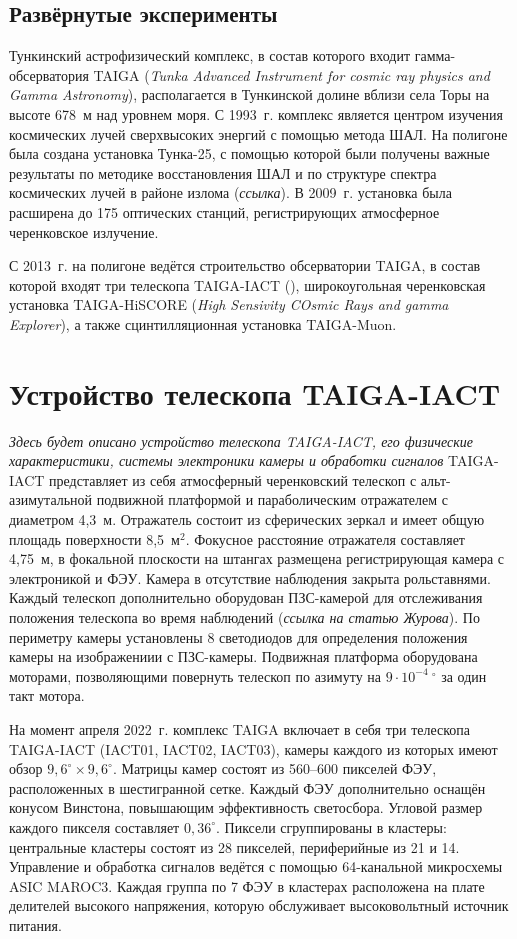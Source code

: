 \documentclass[magd,floatypics,numeref]{msudipl} %
\begin{document}
\subsection{Развёрнутые эксперименты}
Тункинский астрофизический комплекс, в состав которого входит гамма-обсерватория TAIGA (\textit{Tunka Advanced Instrument for cosmic ray physics and Gamma Astronomy}), располагается в Тункинской долине вблизи села Торы на высоте 678~м над уровнем моря. С 1993~г. комплекс является центром изучения космических лучей сверхвысоких энергий с помощью метода ШАЛ. На полигоне была создана установка Тунка-25, с помощью которой были получены важные результаты по методике восстановления ШАЛ и по структуре спектра космических лучей в районе излома (\textit{ссылка}). В 2009~г. установка была расширена до 175 оптических станций, регистрирующих атмосферное черенковское излучение. 

С 2013~г. на полигоне ведётся строительство обсерватории TAIGA, в состав которой входят три телескопа TAIGA-IACT (), широкоугольная черенковская установка TAIGA-HiSCORE (\textit{High Sensivity COsmic Rays and gamma Explorer}), а также сцинтилляционная установка TAIGA-Muon.
\section{Устройство телескопа TAIGA-IACT}
\textit{
Здесь будет описано устройство телескопа TAIGA-IACT, его физические характеристики, системы электроники камеры и обработки сигналов
}
TAIGA-IACT представляет из себя атмосферный черенковский телескоп с альт-азимутальной подвижной платформой и параболическим отражателем с диаметром 4,3~м. Отражатель состоит из сферических зеркал и имеет общую площадь поверхности 8,5~$\text{м}^\text{2}$. Фокусное расстояние отражателя составляет 4,75~м, в фокальной плоскости на штангах размещена регистрирующая камера с электроникой и ФЭУ. Камера в отсутствие наблюдения закрыта рольставнями. Каждый телескоп дополнительно оборудован ПЗС-камерой для отслеживания положения телескопа во время наблюдений (\textit{ссылка на статью Журова}). По периметру камеры установлены 8 светодиодов для определения положения камеры на изображениии с ПЗС-камеры. Подвижная платформа оборудована моторами, позволяющими повернуть телескоп по азимуту на $9\cdot10^{-4}~^{\circ}$ за один такт мотора. 

На момент апреля 2022~г. комплекс TAIGA включает в себя три телескопа TAIGA-IACT (IACT01, IACT02, IACT03), камеры каждого из которых имеют обзор $9,\!6^{\circ}\times9,\!6^{\circ}$. Матрицы камер состоят из 560--600 пикселей ФЭУ, расположенных в шестигранной сетке. Каждый ФЭУ дополнительно оснащён конусом Винстона, повышающим эффективность светосбора. Угловой размер каждого пикселя составляет $0,\!36^{\circ}$. Пиксели сгруппированы в кластеры: центральные кластеры состоят из 28 пикселей, периферийные из 21 и 14. Управление и обработка сигналов ведётся с помощью 64-канальной микросхемы ASIC MAROC3. Каждая группа по 7 ФЭУ в кластерах расположена на плате делителей высокого напряжения, которую обслуживает высоковольтный источник питания. 
\end{document}
